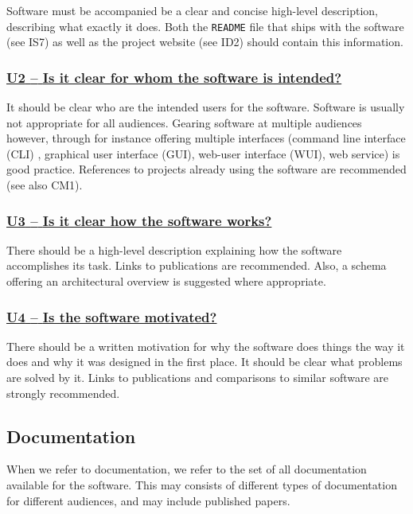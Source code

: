 \documentclass[a4paper,11pt]{article}
\newcommand{\indicator}[1]{\subsubsection*{\underline{#1}}}
\begin{document}
Software must be accompanied be a clear and concise high-level description,
describing what exactly it does. Both the \texttt{README} file that ships with
the software (see IS7) as well as the project website (see ID2) should contain
this information. 

\newcommand{\uTwoName}{U2}
\newcommand{\uTwoID}{\uTwoName}
\newcommand{\uTwoText}{Is it clear for whom the software is intended?}
\indicator{\uTwoName{ }--{ }\uTwoText}\label{id:u2}

It should be clear who are the intended users for the software. Software is
usually not appropriate for all audiences. Gearing software at multiple
audiences however, through for instance offering multiple interfaces (command
line interface (CLI) , graphical user interface (GUI), web-user interface
(WUI), web service) is good practice. References to projects already using the
software are recommended (see also CM1).

\newcommand{\uThreeName}{U3}
\newcommand{\uThreeID}{\uThreeName}
\newcommand{\uThreeText}{Is it clear how the software works?}
\indicator{\uThreeName{ }--{ }\uThreeText}\label{id:u3}

There should be a high-level description explaining how the software
accomplishes its task. Links to publications are recommended. Also, a schema
offering an architectural overview is suggested where appropriate. 

\newcommand{\uFourName}{U4}
\newcommand{\uFourID}{\uFourName}
\newcommand{\uFourText}{Is the software motivated?}
\indicator{\uFourName{ }--{ }\uFourText}\label{id:u4}

There should be a written motivation for why the software does things the way
it does and why it was designed in the first place. It should be clear what
problems are solved by it. Links to publications and comparisons to similar
software are strongly recommended.

\subsection{Documentation}\label{sec:doc}

When we refer to documentation, we refer to the set of all documentation
available for the software. This may consists of different types of
documentation for different audiences, and may include published papers.
\end{document}
